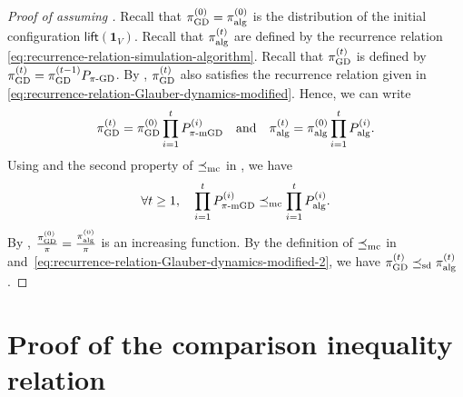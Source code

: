 \documentclass[11pt,a4paper]{article}
\newcommand{\mc}{\preceq_{\textnormal{mc}}}
\newcommand{\sd}{\preceq_{\textnormal{sd}}}
\theoremstyle{definition}
\def\*#1{\mathbf{#1}} %
\begin{document}
\begin{proof}[Proof of  assuming ]
    Recall that $\pi^{(0)}_{\textnormal{GD}} = \pi^{(0)}_{\textnormal{alg}}$ is the distribution of the initial configuration $\textsf{lift}(\*1_V)$.
Recall that $\pi^{(t)}_{\textnormal{alg}}$ are defined by the recurrence relation \eqref{eq:recurrence-relation-simulation-algorithm}. Recall that $\pi^{(t)}_{\textnormal{GD}}$ is defined by $\pi^{(t)}_{\textnormal{GD}} = \pi^{(t-1)}_{\textnormal{GD}}P_{\pi\textnormal{-GD}}$. By , $\pi^{(t)}_{\textnormal{GD}}$ also satisfies the recurrence relation given in \eqref{eq:recurrence-relation-Glauber-dynamics-modified}. Hence, we can write 
\begin{align}\label{eq:recurrence-relation-Glauber-dynamics-modified-2}
\pi^{(t)}_{\textnormal{GD}} = \pi^{(0)}_{\textnormal{GD}}\prod_{i=1}^t P_{\pi\textnormal{-mGD}}^{(i)} \quad\text{and}\quad \pi^{(t)}_{\textnormal{alg}} = \pi^{(0)}_{\textnormal{alg}}\prod_{i=1}^t P_{\textnormal{alg}}^{(i)}. 
\end{align}
Using  and the second property of $\mc$ in , we have
\begin{align*}
  \forall t \geq 1, \quad \prod_{i=1}^t P_{\pi\textnormal{-mGD}}^{(i)}  \mc \prod_{i=1}^t P_{\textnormal{alg}}^{(i)}.  
\end{align*}
By , $\frac{\pi^{(0)}_{\textnormal{GD}}}{\pi} = \frac{\pi^{(0)}_{\textnormal{alg}}}{\pi}$ is an increasing function. By the definition of $\mc$ in  and~\eqref{eq:recurrence-relation-Glauber-dynamics-modified-2}, we have $\pi^{(t)}_{\textnormal{GD}} \sd \pi^{(t)}_{\textnormal{alg}}$.
\end{proof}






\section{Proof of the comparison inequality relation}\label{sec:proof-dominance}
\end{document}
